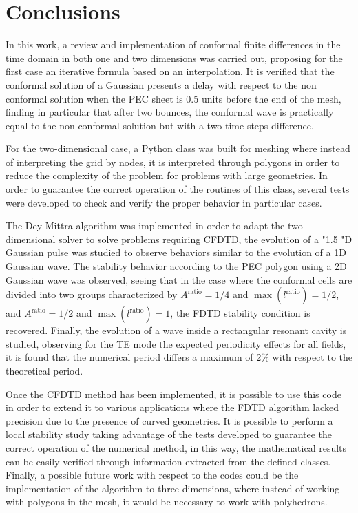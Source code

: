 \documentclass[12pt, oneside]{book}
\begin{document}
\chapter{Conclusions}

In this work, a review and implementation of conformal finite differences in the time domain in both one and two dimensions was carried out, proposing for the first case an iterative formula based on an interpolation. It is verified that the conformal solution of a Gaussian presents a delay with respect to the non conformal solution when the PEC sheet is 0.5 units before the end of the mesh, finding in particular that after two bounces, the conformal wave is practically equal to the non conformal solution but with a two time steps difference.

For the two-dimensional case, a Python class was built for meshing where instead of interpreting the grid by nodes, it is interpreted through polygons in order to reduce the complexity of the problem for problems with large geometries. In order to guarantee the correct operation of the routines of this class, several tests were developed to check and verify the proper behavior in particular cases.

The Dey-Mittra algorithm was implemented in order to adapt the two-dimensional solver to solve problems requiring CFDTD, the evolution of a "1.5 "D Gaussian pulse was studied to observe behaviors similar to the evolution of a 1D Gaussian wave. The stability behavior according to the PEC polygon using a 2D Gaussian wave was observed, seeing that in the case where the conformal cells are divided into two groups characterized by $A^{\text{ratio}} = 1/4$ and $\max({l^{\text{ratio}}}) = 1/2$, and $A^{\text{ratio}} = 1/2$ and $\max({l^{\text{ratio}}}) = 1$, the FDTD stability condition is recovered. Finally, the evolution of a wave inside a rectangular resonant cavity is studied, observing for the TE mode the expected periodicity effects for all fields, it is found that the numerical period differs a maximum of 2\% with respect to the theoretical period. 

Once the CFDTD method has been implemented, it is possible to use this code in order to extend it to various applications where the FDTD algorithm lacked precision due to the presence of curved geometries. It is possible to perform a local stability study taking advantage of the tests developed to guarantee the correct operation of the numerical method, in this way, the mathematical results can be easily verified through information extracted from the defined classes. Finally, a possible future work with respect to the codes could be the implementation of the algorithm to three dimensions, where instead of working with polygons in the mesh, it would be necessary to work with polyhedrons.
\end{document}
